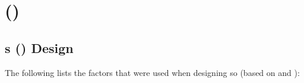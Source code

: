 \label{chap:chapter2}

\section[Stack Overflow]{ ()}
\label{sec:stackoverflow}

\subsection[Stack Overflows design]{s () Design}
\label{sec:stackoverflow_design}
The following lists the factors that were used when designing \gls{so} (based on \textcite[p.~6-7]{M.Sewak2010} and \textcite[p.~805]{Treude2011}):
